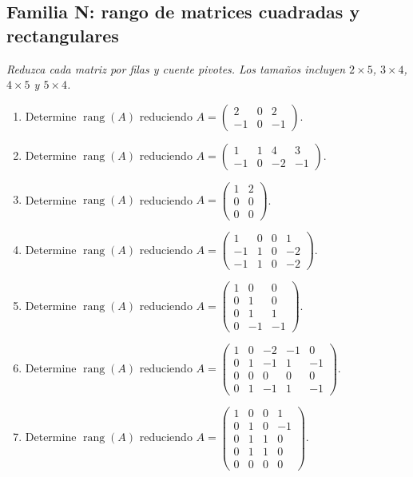 \documentclass[12pt]{article}
\theoremstyle{remark}
\newcommand{\rang}{\operatorname{rang}}
\newcounter{contadorEjercicio}
\newenvironment{listaejercicios}{\begin{enumerate}[label=\textbf{E\arabic*.},leftmargin=2.4em,itemsep=0.52em]\setcounter{enumi}{\value{contadorEjercicio}}}{\setcounter{contadorEjercicio}{\value{enumi}}\end{enumerate}}
\begin{document}
\subsection{Familia N: rango de matrices cuadradas y rectangulares}\noindent\textit{Reduzca cada matriz por filas y cuente pivotes. Los tamaños incluyen $2\times5$, $3\times4$, $4\times5$ y $5\times4$.}\par\medskip
\begin{listaejercicios}

\item Determine $\rang(A)$ reduciendo $A=\begin{pmatrix}2&0&2\\-1&0&-1\end{pmatrix}$.

\item Determine $\rang(A)$ reduciendo $A=\begin{pmatrix}1&1&4&3\\-1&0&-2&-1\end{pmatrix}$.

\item Determine $\rang(A)$ reduciendo $A=\begin{pmatrix}1&2\\0&0\\0&0\end{pmatrix}$.

\item Determine $\rang(A)$ reduciendo $A=\begin{pmatrix}1&0&0&1\\-1&1&0&-2\\-1&1&0&-2\end{pmatrix}$.

\item Determine $\rang(A)$ reduciendo $A=\begin{pmatrix}1&0&0\\0&1&0\\0&1&1\\0&-1&-1\end{pmatrix}$.

\item Determine $\rang(A)$ reduciendo $A=\begin{pmatrix}1&0&-2&-1&0\\0&1&-1&1&-1\\0&0&0&0&0\\0&1&-1&1&-1\end{pmatrix}$.

\item Determine $\rang(A)$ reduciendo $A=\begin{pmatrix}1&0&0&1\\0&1&0&-1\\0&1&1&0\\0&1&1&0\\0&0&0&0\end{pmatrix}$.


\end{listaejercicios}
\end{document}
